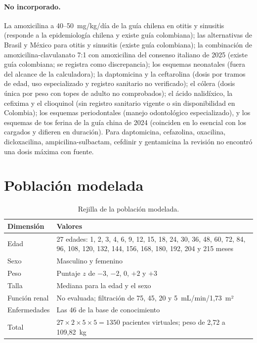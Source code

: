 \documentclass[10pt,a4paper]{article}
\begin{document}
\paragraph{No incorporado.} La amoxicilina a 40--50~mg/kg/día de la guía chilena en otitis y sinusitis (responde a la epidemiología chilena y existe guía colombiana); las alternativas de Brasil y México para otitis y sinusitis (existe guía colombiana); la combinación de amoxicilina-clavulanato 7:1 con amoxicilina del consenso italiano de 2025 (existe guía colombiana; se registra como discrepancia); los esquemas neonatales (fuera del alcance de la calculadora); la daptomicina y la ceftarolina (dosis por tramos de edad, uso especializado y registro sanitario no verificado); el cólera (dosis única por peso con topes de adulto no comprobados); el ácido nalidíxico, la cefixima y el clioquinol (sin registro sanitario vigente o sin disponibilidad en Colombia); los esquemas periodontales (manejo odontológico especializado), y los esquemas de tos ferina de la guía china de 2024 (coinciden en lo esencial con los cargados y difieren en duración). Para daptomicina, cefazolina, oxacilina, dicloxacilina, ampicilina-sulbactam, cefdinir y gentamicina la revisión no encontró una dosis máxima con fuente.

\section{Población modelada}

\begin{table}[htbp]
\centering
\caption{Rejilla de la población modelada.}
\small
\begin{tabularx}{\textwidth}{@{}lX@{}}
\toprule
Dimensión & Valores \\
\midrule
Edad & 27 edades: 1, 2, 3, 4, 6, 9, 12, 15, 18, 24, 30, 36, 48, 60, 72, 84, 96, 108, 120, 132, 144, 156, 168, 180, 192, 204 y 215 meses \\
Sexo & Masculino y femenino \\
Peso & Puntaje $z$ de $-3$, $-2$, 0, $+2$ y $+3$ \\
Talla & Mediana para la edad y el sexo \\
Función renal & No evaluada; filtración de 75, 45, 20 y 5~mL/min/1,73~m² \\
Enfermedades & Las 46 de la base de conocimiento \\
\midrule
Total & $27 \times 2 \times 5 \times 5 = \num{1350}$ pacientes virtuales; peso de 2,72 a 109,82~kg \\
\bottomrule
\end{tabularx}
\end{table}
\end{document}
